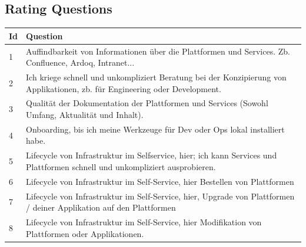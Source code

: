 \documentclass[a4paper,10pt]{article}
\begin{document}
    \subsection{Rating Questions}
    \label{subsec:rating}
    \begin{table}[!htbp]
        \begin{center}
            \begin{tabularx}{\textwidth}{lX}
                \toprule
                Id & Question                                                                                                                                                                              \\
                \midrule
                1  & Auffindbarkeit von Informationen über die Plattformen und Services. Zb. Confluence, Ardoq, Intranet...                                                                                \\
                2  & Ich kriege schnell und unkompliziert Beratung bei der Konzipierung von Applikationen, zb. für Engineering oder Development.                                                           \\
                3  & Qualität der Dokumentation der Plattformen und Services (Sowohl Umfang, Aktualität und Inhalt).                                                                                       \\
                4  & Onboarding, bis ich meine Werkzeuge für Dev oder Ops lokal installiert habe.                                                                                                          \\
                5  & Lifecycle von Infrastruktur im Selfservice, hier; ich kann Services und Plattformen schnell und unkompliziert ausprobieren.                                                           \\
                6  & Lifecycle von Infrastruktur im Self-Service, hier Bestellen von Plattformen                                                                                                           \\
                7  & Lifecycle von Infrastruktur im Self-Service, hier, Upgrade von Plattformen / deiner Applikation auf den Plattformen                                                                   \\
                8  & Lifecycle von Infrastruktur im Self-Service, hier Modifikation von Plattformen oder Applikationen.                                                                                    \\

\end{tabularx}
\end{center}
\end{table}
\end{document}
